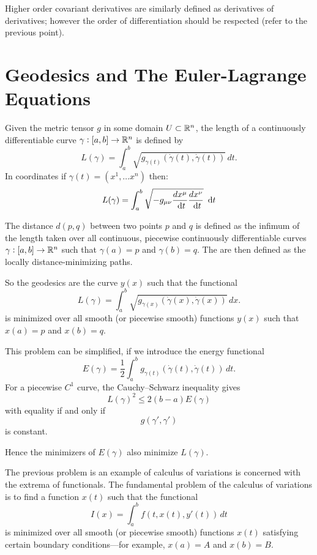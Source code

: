  Higher order covariant derivatives are similarly defined
as derivatives of derivatives; however the order of differentiation
should be respected (refer to the previous point).



\section{Geodesics and The Euler-Lagrange Equations }

Given the  metric tensor $g$ in some domain $U\subset \mathbb{R}^n$, the length of a continuously differentiable curve $\gamma :[a,b] \to \mathbb{R}^n$ is defined by
\[L(\gamma)=\int_a^b \sqrt{  g_{\gamma(t)}(\dot\gamma(t),\dot\gamma(t)) }\,dt.\]
In coordinates if $\gamma(t)=(x^1, \dots x^n)$ then:
\[L(\gamma)=\int_a^b\sqrt{-g_{\mu\nu}\frac{dx^{\mu}}{\dt}\frac{dx^{\nu}}{\dt}}\dt\]


The distance $d(p,q)$ between two points $p$ and $q$  is defined as the infimum of the length taken over all continuous, piecewise continuously differentiable curves $\gamma : [a,b] \to \mathbb{R}^n$ such that $\gamma(a) = p$ and $\gamma(b) = q$. 
The   are then defined as the  locally distance-minimizing paths.

So the geodesics  are the curve $y(x)$ such that the functional
\[L(\gamma)=\int_a^b \sqrt{  g_{\gamma(x)}(\dot\gamma(x),\dot\gamma(x)) }\,dx.\]
is minimized over all smooth (or piecewise smooth) functions $y(x)$
such that  $x(a) = p$ and $x(b)
= q$. 

This problem can be simplified,  if we  introduce the energy functional
\[E(\gamma)=\frac{1}{2}\int_a^b g_{\gamma(t)}(\dot\gamma(t),\dot\gamma(t))\,dt.\]
For a piecewise $C^1$ curve, the Cauchy–Schwarz inequality gives
\[L(\gamma)^2 \le 2(b-a)E(\gamma)\]
with equality if and only if \[g(\gamma',\gamma')\] is  constant.

Hence the minimizers of $E(\gamma)$ also minimize $L(\gamma)$.

The previous problem is an example of calculus of variations is concerned with the  extrema of functionals.
The  fundamental problem of the calculus of variations is to find a
function $x(t)$ such that the functional
\[
  I(x) = \int_a^b f(t,x(t),y'(t))\, dt
  \]
is minimized over all smooth (or piecewise smooth) functions $x(t)$
satisfying certain boundary conditions---for example, $x(a) = A$ and $x(b)
= B$.  

